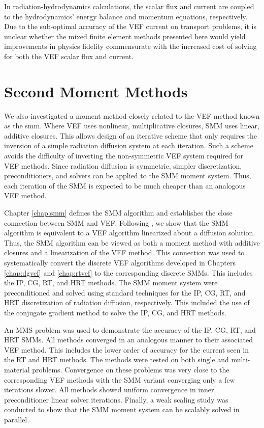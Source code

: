 \documentclass[../doc.tex]{subfiles}
\begin{document}
In radiation-hydrodynamics calculations, the scalar flux and current are coupled to the hydrodynamics' energy balance and momentum equations, respectively. 
Due to the sub-optimal accuracy of the VEF current on transport problems, it is unclear whether the mixed finite element methods presented here would yield improvements in physics fidelity commensurate with the increased cost of solving for both the VEF scalar flux and current. 

\section{Second Moment Methods}
We also investigated a moment method closely related to the VEF method known as the \gls{smm}. Where VEF uses nonlinear, multiplicative closures, SMM uses linear, additive closures. This allows design of an iterative scheme that only requires the inversion of a simple radiation diffusion system at each iteration. Such a scheme avoids the difficulty of inverting the non-symmetric VEF system required for VEF methods. Since radiation diffusion is symmetric, simpler discretization, preconditioners, and solvers can be applied to the SMM moment system. Thus, each iteration of the SMM is expected to be much cheaper than an analogous VEF method. 

Chapter \ref{chap:smm} defines the SMM algorithm and establishes the close connection between SMM and VEF. Following \textcite{cefus}, we show that the SMM algorithm is equivalent to a VEF algorithm linearized about a diffusion solution. Thus, the SMM algorithm can be viewed as both a moment method with additive closures and a linearization of the VEF method. This connection was used to systematically convert the discrete VEF algorithms developed in Chapters \ref{chap:dgvef} and \ref{chap:rtvef} to the corresponding discrete SMMs. This includes the IP, CG, RT, and HRT methods. The SMM moment system were preconditioned and solved using standard techniques for the IP, CG, RT, and HRT discretization of radiation diffusion, respectively. This included the use of the conjugate gradient method to solve the IP, CG, and HRT methods. 

An MMS problem was used to demonstrate the accuracy of the IP, CG, RT, and HRT SMMs. All methods converged in an analogous manner to their associated VEF method. This includes the lower order of accuracy for the current seen in the RT and HRT methods. The methods were tested on both single and multi-material problems. Convergence on these problems was very close to the corresponding VEF methods with the SMM variant converging only a few iterations slower. All methods showed uniform convergence in inner preconditioner linear solver iterations. Finally, a weak scaling study was conducted to show that the SMM moment system can be scalably solved in parallel. 
\end{document}

